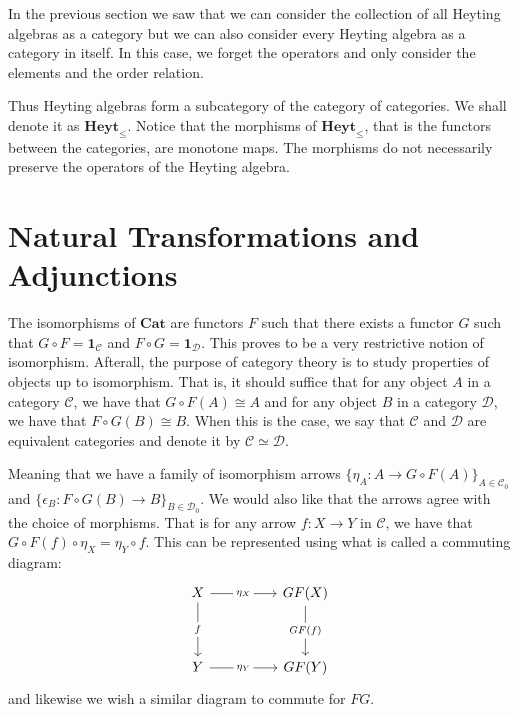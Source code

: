 \begin{remark}
    In the previous section we saw that we can consider the collection of all Heyting algebras as a category
    but we can also consider every Heyting algebra as a category in itself.
    In this case, we forget the operators
    and only consider the elements and the order relation.

    Thus Heyting algebras form a subcategory of the category of categories.
    We shall denote it as $\mathbf{Heyt}_{\leq}$.
    Notice that the morphisms of $\mathbf{Heyt}_{\leq}$,
    that is the functors between the categories, are 
    monotone maps. The morphisms do not necessarily
    preserve the operators of the Heyting algebra.
\end{remark}

\section{Natural Transformations and Adjunctions}

The isomorphisms of $\mathbf{Cat}$
are functors $F$ such that there exists a functor 
$G$ such that $G\circ F=\mathbf{1}_{\mathcal{C}}$
and $F\circ G=\mathbf{1}_{\mathcal{D}}$.
This proves to be a very restrictive notion of isomorphism.
Afterall, the purpose of category theory is to study properties 
of objects up to isomorphism. That is,
it should suffice that 
for any object $A$ in a category $\mathcal{C}$,
we have that $G\circ F(A)\cong A$
and for any object $B$ in a category $\mathcal{D}$,
we have that $F\circ G(B)\cong B$.
When this is the case, we say that $\mathcal{C}$ and $\mathcal{D}$ 
are equivalent categories and denote it by 
$\mathcal{C}\simeq\mathcal{D}$.

Meaning that we have a family of isomorphism arrows
$\{\eta_A:A\to G\circ F(A)\}_{A\in\mathcal{C}_0}$
and
$\{\epsilon_B:F\circ G(B)\to B\}_{B\in\mathcal{D}_0}$.
We would also like that the
arrows agree with the choice of morphisms. That is
for any arrow $f:X\to Y$ in $\mathcal{C}$,
we have that $G\circ F(f)\circ \eta_X=\eta_Y\circ f$. This can be
represented using what is called a commuting diagram:
\[\begin{tikzcd}
	X && {GF(X)} \\
	\\
	Y && {GF(Y)}
	\arrow["{GF(f)}"{description}, from=1-3, to=3-3]
	\arrow["f"{description}, from=1-1, to=3-1]
	\arrow["{\eta_Y}"{description}, from=3-1, to=3-3]
	\arrow["{\eta_X}"{description}, from=1-1, to=1-3]
\end{tikzcd}\]
and likewise we wish a similar diagram to commute for $FG$.

